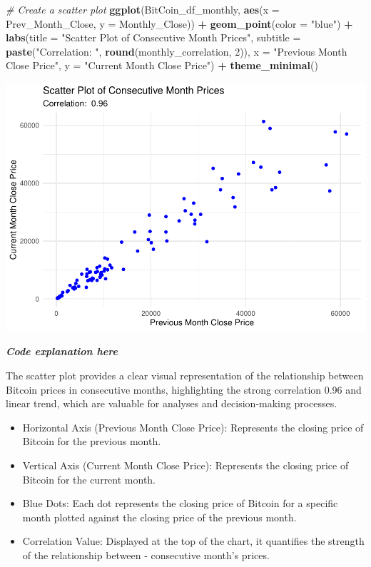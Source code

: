 \documentclass[
]{book}
\newenvironment{Shaded}{\begin{snugshade}}{\end{snugshade}}
\newcommand{\AttributeTok}[1]{\textcolor[rgb]{0.13,0.29,0.53}{#1}}
\newcommand{\CommentTok}[1]{\textcolor[rgb]{0.56,0.35,0.01}{\textit{#1}}}
\newcommand{\DecValTok}[1]{\textcolor[rgb]{0.00,0.00,0.81}{#1}}
\newcommand{\FunctionTok}[1]{\textcolor[rgb]{0.13,0.29,0.53}{\textbf{#1}}}
\newcommand{\NormalTok}[1]{#1}
\newcommand{\SpecialCharTok}[1]{\textcolor[rgb]{0.81,0.36,0.00}{\textbf{#1}}}
\newcommand{\StringTok}[1]{\textcolor[rgb]{0.31,0.60,0.02}{#1}}
\providecommand{\tightlist}{%
  \setlength{\itemsep}{0pt}\setlength{\parskip}{0pt}}
\begin{document}
\begin{Shaded}
\begin{Highlighting}[]
\CommentTok{\# Create a scatter plot}
\FunctionTok{ggplot}\NormalTok{(BitCoin\_df\_monthly, }\FunctionTok{aes}\NormalTok{(}\AttributeTok{x =}\NormalTok{ Prev\_Month\_Close, }\AttributeTok{y =}\NormalTok{ Monthly\_Close)) }\SpecialCharTok{+}
  \FunctionTok{geom\_point}\NormalTok{(}\AttributeTok{color =} \StringTok{"blue"}\NormalTok{) }\SpecialCharTok{+}
  \FunctionTok{labs}\NormalTok{(}\AttributeTok{title =} \StringTok{"Scatter Plot of Consecutive Month Prices"}\NormalTok{,}
       \AttributeTok{subtitle =} \FunctionTok{paste}\NormalTok{(}\StringTok{"Correlation: "}\NormalTok{, }\FunctionTok{round}\NormalTok{(monthly\_correlation, }\DecValTok{2}\NormalTok{)),}
       \AttributeTok{x =} \StringTok{"Previous Month Close Price"}\NormalTok{,}
       \AttributeTok{y =} \StringTok{"Current Month Close Price"}\NormalTok{) }\SpecialCharTok{+}
  \FunctionTok{theme\_minimal}\NormalTok{()}
\end{Highlighting}
\end{Shaded}

\includegraphics{bookdown-demo_files/figure-latex/unnamed-chunk-14-1.pdf}

\emph{\textbf{Code explanation here}}

The scatter plot provides a clear visual representation of the relationship between Bitcoin prices in consecutive months, highlighting the strong correlation 0.96 and linear trend, which are valuable for analyses and decision-making processes.

\begin{itemize}
\tightlist
\item
  Horizontal Axis (Previous Month Close Price): Represents the closing price of Bitcoin for the previous month.
\item
  Vertical Axis (Current Month Close Price): Represents the closing price of Bitcoin for the current month.
\item
  Blue Dots: Each dot represents the closing price of Bitcoin for a specific month plotted against the closing price of the previous month.
\item
  Correlation Value: Displayed at the top of the chart, it quantifies the strength of the relationship between - consecutive month's prices.
\end{itemize}
\end{document}
